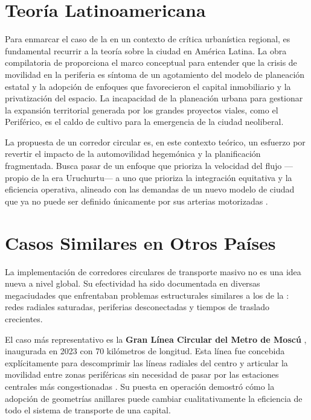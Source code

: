 \section{Teoría Latinoamericana}
\label{sec:teoria-latinoamericana}

Para enmarcar el caso de la \cdmx{} en un contexto de crítica urbanística
regional,
es fundamental recurrir a la teoría sobre la ciudad en América Latina. La obra
compilatoria de \citet{padilla2007} proporciona el marco conceptual para
entender
que la crisis de movilidad en la periferia es síntoma de un agotamiento del
modelo
de planeación estatal y la adopción de enfoques que favorecieron el capital
inmobiliario y la privatización del espacio. La incapacidad de la planeación
urbana
para gestionar la expansión territorial generada por los grandes proyectos
viales,
como el Periférico, es el caldo de cultivo para la emergencia de la ciudad
neoliberal.

La propuesta de un corredor circular es, en este contexto teórico, un esfuerzo
por
revertir el impacto de la automovilidad hegemónica y la planificación
fragmentada.
Busca pasar de un enfoque que prioriza la velocidad del flujo ---propio de la
era
Uruchurtu--- a uno que prioriza la integración equitativa y la eficiencia
operativa,
alineado con las demandas de un nuevo modelo de ciudad que ya no puede ser
definido únicamente por sus arterias motorizadas \citep{franco2022}.

\section{Casos Similares en Otros Países}
\label{sec:casos-similares}

La implementación de corredores circulares de transporte masivo no es una idea
nueva a nivel global. Su efectividad ha sido documentada en diversas
megaciudades
que enfrentaban problemas estructurales similares a los de la \cdmx{}: redes
radiales saturadas, periferias desconectadas y tiempos de traslado crecientes.

El caso más representativo es la \textbf{Gran Línea Circular del Metro de Moscú}
,
inaugurada en 2023 con 70 kilómetros de longitud. Esta línea fue concebida
explícitamente para descomprimir las líneas radiales del centro y articular la
movilidad entre zonas periféricas sin necesidad de pasar por las estaciones
centrales más congestionadas \citep{efe2023}. Su puesta en operación
demostró cómo la adopción de geometrías anillares puede cambiar cualitativamente
la eficiencia de todo el sistema de transporte de una capital.

